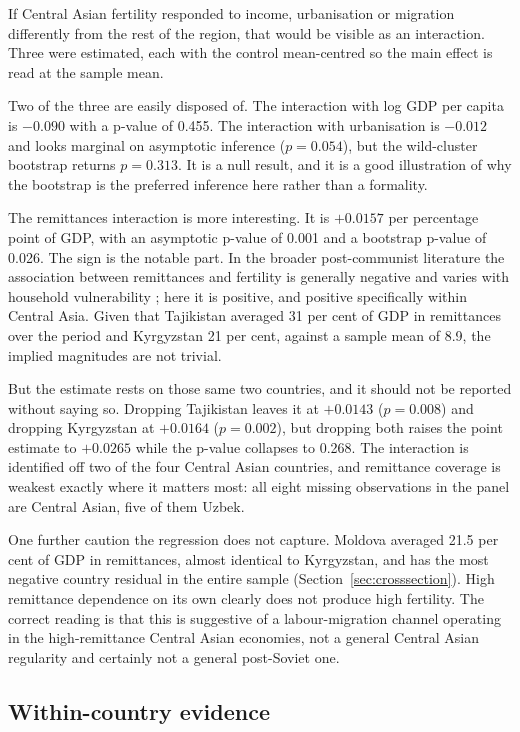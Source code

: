 If Central Asian fertility responded to income, urbanisation or migration differently from the rest of the region, that would be visible as an interaction. Three were estimated, each with the control mean-centred so the main effect is read at the sample mean.

Two of the three are easily disposed of. The interaction with log GDP per capita is $-0.090$ with a p-value of 0.455. The interaction with urbanisation is $-0.012$ and looks marginal on asymptotic inference ($p = 0.054$), but the wild-cluster bootstrap returns $p = 0.313$. It is a null result, and it is a good illustration of why the bootstrap is the preferred inference here rather than a formality.

The remittances interaction is more interesting. It is $+0.0157$ per percentage point of GDP, with an asymptotic p-value of 0.001 and a bootstrap p-value of 0.026. The sign is the notable part. In the broader post-communist literature the association between remittances and fertility is generally negative and varies with household vulnerability \parencite{tokhirov2024}; here it is positive, and positive specifically within Central Asia. Given that Tajikistan averaged 31 per cent of GDP in remittances over the period and Kyrgyzstan 21 per cent, against a sample mean of 8.9, the implied magnitudes are not trivial.

But the estimate rests on those same two countries, and it should not be reported without saying so. Dropping Tajikistan leaves it at $+0.0143$ ($p = 0.008$) and dropping Kyrgyzstan at $+0.0164$ ($p = 0.002$), but dropping both raises the point estimate to $+0.0265$ while the p-value collapses to 0.268. The interaction is identified off two of the four Central Asian countries, and remittance coverage is weakest exactly where it matters most: all eight missing observations in the panel are Central Asian, five of them Uzbek.

One further caution the regression does not capture. Moldova averaged 21.5 per cent of GDP in remittances, almost identical to Kyrgyzstan, and has the most negative country residual in the entire sample (Section~\ref{sec:crosssection}). High remittance dependence on its own clearly does not produce high fertility. The correct reading is that this is suggestive of a labour-migration channel operating in the high-remittance Central Asian economies, not a general Central Asian regularity and certainly not a general post-Soviet one.

\subsection{Within-country evidence}
\label{sec:within}

